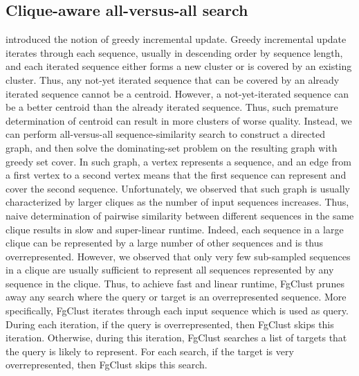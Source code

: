 \documentclass[11pt,letterpaper]{article}
\begin{document}
\subsection{Clique-aware all-versus-all search}

 introduced the notion of greedy incremental update.
Greedy incremental update iterates through each sequence, usually in descending order by sequence length, and each iterated sequence either forms a new cluster or is covered by an existing cluster.
Thus, any not-yet iterated sequence that can be covered by an already iterated sequence cannot be a centroid.
However, a not-yet-iterated sequence can be a better centroid than the already iterated sequence.
Thus, such premature determination of centroid can result in more clusters of worse quality.
Instead, we can perform all-versus-all sequence-similarity search to construct a directed graph, and then solve the dominating-set problem on the resulting graph with greedy set cover.
In such graph, a vertex represents a sequence, and an edge from a first vertex to a second vertex means that the first sequence can represent and cover the second sequence.
Unfortunately, we observed that such graph is usually characterized by larger cliques as the number of input sequences increases.
Thus, naive determination of pairwise similarity between different sequences in the same clique results in slow and super-linear runtime.
Indeed, each sequence in a large clique can be represented by a large number of other sequences and is thus overrepresented.
However, we observed that only very few sub-sampled sequences in a clique are usually sufficient to represent all sequences represented by any sequence in the clique.
Thus, to achieve fast and linear runtime, FgClust prunes away any search where the query or target is an overrepresented sequence.
More specifically, FgClust iterates through each input sequence which is used as query.
During each iteration, if the query is overrepresented, then FgClust skips this iteration.
Otherwise, during this iteration, FgClust searches a list of targets that the query is likely to represent.
For each search, if the target is very overrepresented, then FgClust skips this search.
\end{document}
